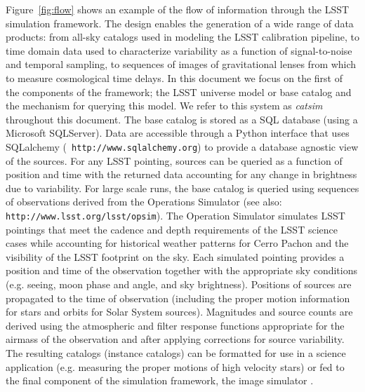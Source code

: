 \documentclass[]{article}
\begin{document}
{Figure~\ref{fig:flow} shows an example of the flow of information
through the LSST simulation framework. 
The design enables the generation of a wide range of data products:
from all-sky catalogs used in modeling the LSST calibration pipeline,
to time domain data used to characterize variability as a function of
signal-to-noise and temporal sampling, to sequences of images of
gravitational lenses from which to measure cosmological time delays.
In this document we focus on the first of the components of the
framework; the LSST universe model or base catalog and the mechanism
for querying this model. We refer to this system as {\it catsim}
throughout this document.  The base catalog is stored as a SQL
database (using a Microsoft SQLServer). Data are accessible through a
Python interface that uses SQLalchemy ({\tt
  http://www.sqlalchemy.org}) to provide a database agnostic view of
the sources. For any LSST pointing, sources can be queried as a
function of position and time with the returned data accounting for
any change in brightness due to variability. For large scale runs, the
base catalog is queried using sequences of observations derived from
the Operations Simulator \citep{cook09} (see also: {\tt
  http://www.lsst.org/lsst/opsim}).  The Operation Simulator simulates
LSST pointings that meet the cadence and depth requirements of the
LSST science cases while accounting for historical weather patterns
for Cerro Pachon and the visibility of the LSST footprint on the
sky. Each simulated pointing provides a position and time of the
observation together with the appropriate sky conditions (e.g. seeing,
moon phase and angle, and sky brightness). Positions of sources are
propagated to the time of observation (including the proper motion
information for stars and orbits for Solar System sources). Magnitudes
and source counts are derived using the atmospheric and filter
response functions appropriate for the airmass of the observation and
after applying corrections for source variability. The resulting
catalogs (instance catalogs) can be formatted for use in a science
application (e.g. measuring the proper motions of high velocity stars)
or fed to the final component of the simulation framework, the image
simulator \citep{phosim}.
\begin{figure}[H]

\end{figure}}
\end{document}
